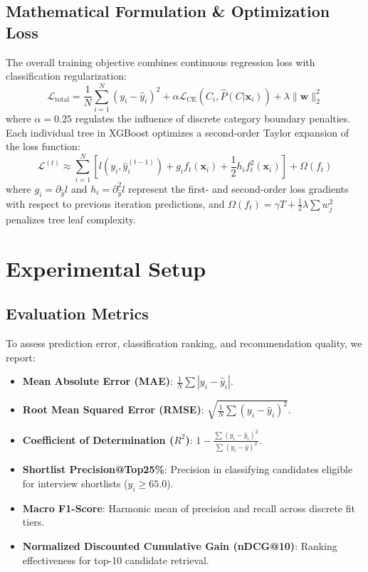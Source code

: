 \documentclass[conference]{IEEEtran}
\begin{document}
\subsection{Mathematical Formulation \& Optimization Loss}
The overall training objective combines continuous regression loss with classification regularization:
\begin{equation}
\mathcal{L}_{\text{total}} = \frac{1}{N}\sum_{i=1}^N (y_i - \hat{y}_i)^2 + \alpha \mathcal{L}_{\text{CE}}(C_i, \hat{P}(C | \mathbf{x}_i)) + \lambda \|\mathbf{w}\|_2^2
\end{equation}
where $\alpha = 0.25$ regulates the influence of discrete category boundary penalties. Each individual tree in XGBoost optimizes a second-order Taylor expansion of the loss function:
\begin{equation}
\mathcal{L}^{(t)} \approx \sum_{i=1}^N \left[ l(y_i, \hat{y}_i^{(t-1)}) + g_i f_t(\mathbf{x}_i) + \frac{1}{2} h_i f_t^2(\mathbf{x}_i) \right] + \Omega(f_t)
\end{equation}
where $g_i = \partial_{\hat{y}} l$ and $h_i = \partial^2_{\hat{y}} l$ represent the first- and second-order loss gradients with respect to previous iteration predictions, and $\Omega(f_t) = \gamma T + \frac{1}{2}\lambda \sum w_j^2$ penalizes tree leaf complexity.

\section{Experimental Setup}

\subsection{Evaluation Metrics}
To assess prediction error, classification ranking, and recommendation quality, we report:
\begin{itemize}
    \item \textbf{Mean Absolute Error (MAE)}: $\frac{1}{N}\sum |y_i - \hat{y}_i|$.
    \item \textbf{Root Mean Squared Error (RMSE)}: $\sqrt{\frac{1}{N}\sum (y_i - \hat{y}_i)^2}$.
    \item \textbf{Coefficient of Determination ($R^2$)}: $1 - \frac{\sum (y_i - \hat{y}_i)^2}{\sum (y_i - \bar{y})^2}$.
    \item \textbf{Shortlist Precision@Top25\%}: Precision in classifying candidates eligible for interview shortlists ($y_i \ge 65.0$).
    \item \textbf{Macro F1-Score}: Harmonic mean of precision and recall across discrete fit tiers.
    \item \textbf{Normalized Discounted Cumulative Gain (nDCG@10)}: Ranking effectiveness for top-10 candidate retrieval.
\end{itemize}
\end{document}
